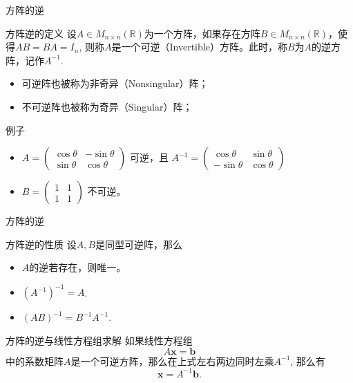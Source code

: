 
\begin{frame}{方阵的逆}

\begin{block}{方阵逆的定义}
设$A\in M_{n\times n}(\mathbb{R})$为一个方阵，如果存在方阵$B\in M_{n\times n}(\mathbb{R})$，使得$AB = BA = I_n$, 则称$A$是一个可逆（Invertible）方阵。此时，称$B$为$A$的逆方阵，记作$A^{-1}$.

\pause

\begin{itemize}
\item 可逆阵也被称为非奇异（Nonsingular）阵；
\item 不可逆阵也被称为奇异（Singular）阵；
\end{itemize}
\end{block}

\pause

\begin{block}{例子}
\begin{itemize}
\item \(\displaystyle A = \begin{pmatrix}
\cos\theta & -\sin\theta \\ \sin\theta & \cos\theta \end{pmatrix} \text{ 可逆，且 } A^{-1} = \begin{pmatrix}
\cos\theta & \sin\theta \\ -\sin\theta & \cos\theta \end{pmatrix} \)
\item \(\displaystyle B = \begin{pmatrix}
1 & 1 \\ 1 & 1 \end{pmatrix} \text{ 不可逆。}\)
\end{itemize}
\end{block}

\end{frame}


\begin{frame}{方阵的逆}

\begin{block}{方阵逆的性质}
设$A, B$是同型可逆阵，那么
\begin{itemize}
\item $A$的逆若存在，则唯一。
\item $(A^{-1})^{-1} = A$.
\item $(AB)^{-1} = B^{-1}A^{-1}$.
\end{itemize}
\end{block}

\pause

\begin{block}{方阵的逆与线性方程组求解}
如果线性方程组
\[A\mathbf{x} = \mathbf{b}\]
中的系数矩阵$A$是一个{\color{red}可逆方阵}，那么在上式左右两边同时左乘$A^{-1}$, 那么有
\[\mathbf{x} = A^{-1}\mathbf{b}.\]
\end{block}

\end{frame}

